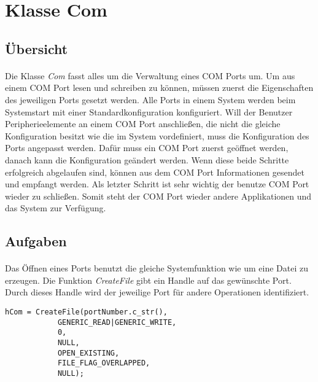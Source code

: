 \section{Klasse Com}
\subsection{Übersicht}
\paragraph{}
Die Klasse \textit{Com} fasst alles um die Verwaltung eines COM Ports um. Um aus einem COM Port lesen und schreiben zu können, müssen zuerst die Eigenschaften des jeweiligen Ports gesetzt werden. Alle Ports in einem System werden beim Systemstart mit einer Standardkonfiguration konfiguriert. Will der Benutzer Peripherieelemente an einem COM Port anschließen, die nicht die gleiche Konfiguration besitzt wie die im System vordefiniert, muss die Konfiguration des Ports angepasst werden. Dafür muss ein COM Port zuerst geöffnet werden, danach kann die Konfiguration geändert werden. Wenn diese beide Schritte erfolgreich abgelaufen sind, können aus dem COM Port Informationen gesendet und empfangt werden. Als letzter Schritt ist sehr wichtig der benutze COM Port wieder zu schließen. Somit steht der COM Port wieder andere Applikationen und das System zur Verfügung.\\

\subsection{Aufgaben}
\paragraph{}
Das Öffnen eines Ports benutzt die gleiche Systemfunktion wie um eine Datei zu erzeugen. Die Funktion \textit{CreateFile} gibt ein Handle auf das gewünschte Port. Durch dieses Handle wird der jeweilige Port für andere Operationen identifiziert.

\begin{lstlisting}	 
hCom = CreateFile(portNumber.c_str(),  
            GENERIC_READ|GENERIC_WRITE,
            0, 
            NULL,
            OPEN_EXISTING, 
            FILE_FLAG_OVERLAPPED,
            NULL); 

\end{lstlisting}

